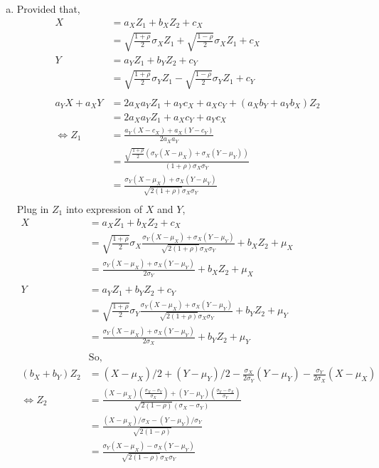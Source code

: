 \documentclass[letterpaper]{article}
\begin{document}
\begin{enumerate}[(a)]
    \item 
    Provided that,
    \begin{align*}
    X & = a_X Z_1 + b_X Z_2 + c_X \\
    & = \sqrt{\frac{1+\rho}{2}} \sigma_X Z_1 + \sqrt{\frac{1-\rho}{2}} \sigma_X Z_1 + c_X \\
    Y & = a_Y Z_1 + b_Y Z_2 + c_Y \\
    & = \sqrt{\frac{1+\rho}{2}} \sigma_Y Z_1 - \sqrt{\frac{1-\rho}{2}} \sigma_Y Z_1 + c_Y \\
    \\
    a_Y X + a_X Y & = 2 a_X a_Y Z_1 + a_Y c_X + a_X c_Y + (a_X b_Y + a_Y b_X) Z_2 \\
    & = 2 a_X a_Y Z_1 + a_X c_Y + a_Y c_X \\
    \iff Z_1 & = \frac{a_Y (X-c_X) + a_X (Y - c_Y)}{2a_Xa_Y} \\
    & = \frac{\sqrt{\frac{1+\rho}{2}} (\sigma_Y(X-\mu_X) + \sigma_X(Y-\mu_Y))}{(1+\rho) \sigma_X \sigma_Y} \\
    & = \frac{\sigma_Y(X-\mu_X) + \sigma_X(Y-\mu_Y)}{\sqrt{2(1+\rho)}\sigma_X \sigma_Y} \\
    \end{align*}
    Plug in $Z_1$ into expression of $X$ and $Y$,
    \begin{align*}
    X & = a_X Z_1 + b_X Z_2 + c_X\\
    & = \sqrt{\frac{1+\rho}{2}} \sigma_X \frac{\sigma_Y(X-\mu_X) + \sigma_X(Y-\mu_Y)}{\sqrt{2(1+\rho)}\sigma_X \sigma_Y} + b_X Z_2 + \mu_X \\
    & = \frac{\sigma_Y(X-\mu_X) + \sigma_X (Y - \mu_Y)}{2 \sigma_Y} + b_X Z_2 + \mu_X\\
    \\
    Y & = a_Y Z_1 + b_Y Z_2 + c_Y\\
    & = \sqrt{\frac{1+\rho}{2}} \sigma_Y \frac{\sigma_Y(X-\mu_X) + \sigma_X(Y-\mu_Y)}{\sqrt{2(1+\rho)}\sigma_X \sigma_Y} + b_Y Z_2 + \mu_Y \\
    & = \frac{\sigma_Y(X-\mu_X) + \sigma_X (Y - \mu_Y)}{2 \sigma_X} + b_Y Z_2 + \mu_Y\\
    \\ 
    & \text{So,}\\
    (b_X + b_Y) Z_2 & = (X - \mu_X)/2 + (Y-\mu_Y)/2 - \frac{\sigma_X}{2\sigma_Y}(Y-\mu_Y) - \frac{\sigma_Y}{2\sigma_X}(X-\mu_X) \\
    \iff Z_2 & = \frac{(X-\mu_X) (\frac{\sigma_X - \sigma_Y}{\sigma_X}) + (Y-\mu_Y) (\frac{\sigma_Y-\sigma_X}{\sigma_Y})}{\sqrt{2(1-\rho)} (\sigma_X - \sigma_Y)} \\
    & = \frac{(X-\mu_X)/\sigma_X - (Y-\mu_Y)/\sigma_Y}{\sqrt{2(1-\rho)}} \\
    & = \frac{\sigma_Y(X-\mu_X) - \sigma_X(Y-\mu_Y)}{\sqrt{2(1-\rho)}\sigma_X \sigma_Y} \\
    \end{align*}


\end{enumerate}
\end{document}
